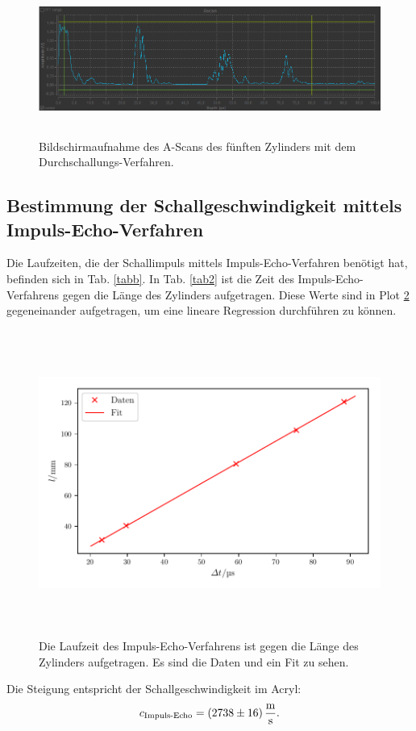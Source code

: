 \begin{figure}
    \centering
    \includegraphics[width=15cm, height=5cm]{build/Messung3.5.png}
    \caption{Bildschirmaufnahme des A-Scans des fünften Zylinders mit dem Durchschallungs-Verfahren.}
    \label{fig:m3.5}
\end{figure}

\subsection{Bestimmung der Schallgeschwindigkeit mittels Impuls-Echo-Verfahren}
Die Laufzeiten, die der Schallimpuls mittels Impuls-Echo-Verfahren benötigt hat,
befinden sich in Tab. \ref{tabb}. In Tab. \ref{tab2} ist die Zeit des Impuls-Echo-Verfahrens
gegen die Länge des Zylinders aufgetragen. Diese Werte sind in Plot \ref{fig:plot2}
gegeneinander aufgetragen, um eine lineare Regression durchführen zu können.


\begin{figure}
    \centering
    \includegraphics[width=15cm, height=10cm]{build/plot2.pdf}
    \caption{Die Laufzeit des Impuls-Echo-Verfahrens ist gegen die Länge des Zylinders
    aufgetragen. Es sind die Daten und ein Fit zu sehen.}
    \label{fig:plot2}
\end{figure}
\noindent Die Steigung entspricht der Schallgeschwindigkeit im Acryl:
\begin{equation*}
    c_{\text{Impuls-Echo}} = \SI{2738 \pm 16}{\meter\per\second}.
\end{equation*}



